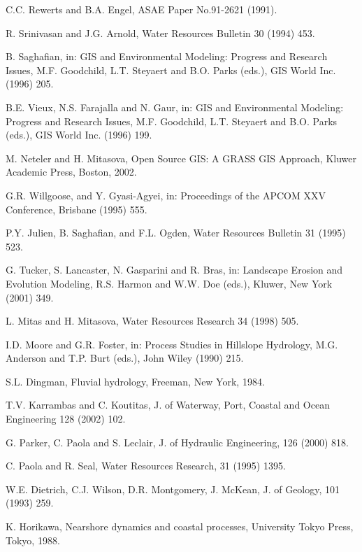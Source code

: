 \documentclass[fleqn,12pt,twoside]{article}
\begin{document}
\begin{thebibliography}{9}

C.C. Rewerts and B.A. Engel, ASAE Paper No.91-2621 (1991).

R. Srinivasan and J.G. Arnold, Water Resources Bulletin 30 (1994) 453.

B. Saghafian, in: GIS and Environmental Modeling: Progress and Research Issues,
M.F. Goodchild, L.T. Steyaert and B.O. Parks (eds.), GIS World Inc. (1996) 205.

B.E. Vieux, N.S. Farajalla and N. Gaur, 
in: GIS and Environmental Modeling: Progress and Research Issues,
M.F. Goodchild, L.T. Steyaert and B.O. Parks (eds.), GIS World Inc. (1996) 199.

M. Neteler and H. Mitasova, Open Source GIS: A GRASS GIS Approach, 
Kluwer Academic Press, Boston, 2002.  

G.R. Willgoose, and Y. Gyasi-Agyei, 
in: Proceedings of the APCOM XXV Conference, Brisbane (1995) 555.

P.Y. Julien, B. Saghafian, and F.L. Ogden, 
Water Resources Bulletin 31 (1995) 523.

G. Tucker, S. Lancaster, N. Gasparini and R. Bras, 
in: Landscape Erosion and Evolution Modeling, R.S. Harmon
and W.W. Doe (eds.), Kluwer, New York (2001) 349.

L. Mitas and H. Mitasova, Water Resources Research 34 (1998) 505.

I.D. Moore and G.R. Foster, 
in:  Process Studies in Hillslope Hydrology, 
M.G. Anderson and T.P. Burt (eds.), John Wiley (1990) 215.

S.L. Dingman, Fluvial hydrology, Freeman, New York, 1984.

T.V. Karrambas and C. Koutitas, 
J. of Waterway, Port, Coastal and Ocean Engineering 128 (2002) 102.

G. Parker, C. Paola and S. Leclair,
J. of Hydraulic Engineering, 126 (2000) 818.


C. Paola and R. Seal, Water Resources Research, 31 (1995) 1395.

W.E. Dietrich, C.J. Wilson, D.R. Montgomery, J. McKean, 
J. of Geology, 101 (1993) 259.

K. Horikawa, Nearshore dynamics and coastal processes, University Tokyo Press,
Tokyo, 1988.


\end{thebibliography}
\end{document}
